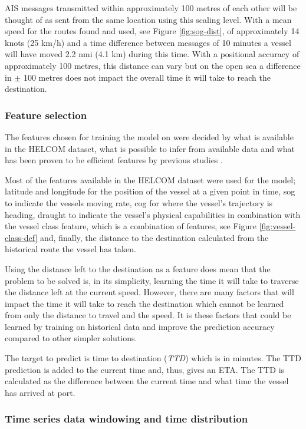 \documentclass[../main.tex]{subfiles}
\begin{document}
AIS messages transmitted within approximately 100 metres of each other will be thought of as sent from the same location using this scaling level. With a mean speed for the routes found and used, see Figure \ref{fig:sog-dist}, of approximately 14 knots (25 km/h) and a time difference between messages of 10 minutes a vessel will have moved 2.2 nmi (4.1 km) during this time. With a positional accuracy of approximately 100 metres, this distance can vary but on the open sea a difference in $\pm$ 100 metres does not impact the overall time it will take to reach the destination.


\subsubsection{Feature selection}

The features chosen for training the model on were decided by what is available in the HELCOM dataset, what is possible to infer from available data and what has been proven to be efficient features by previous studies \cite{El_2020, Jahn_2018}.

Most of the features available in the HELCOM dataset were used for the model; latitude and longitude for the position of the vessel at a given point in time, sog to indicate the vessels moving rate, cog for where the vessel's trajectory is heading, draught to indicate the vessel's physical capabilities in combination with the vessel class feature, which is a combination of features, see Figure \ref{fig:vessel-class-def} and, finally, the distance to the destination calculated from the historical route the vessel has taken.

Using the distance left to the destination as a feature does mean that the problem to be solved is, in its simplicity, learning the time it will take to traverse the distance left at the current speed. However, there are many factors that will impact the time it will take to reach the destination which cannot be learned from only the distance to travel and the speed. It is these factors that could be learned by training on historical data and improve the prediction accuracy compared to other simpler solutions.

The target to predict is time to destination (\textit{TTD}) which is in minutes. The TTD prediction is added to the current time and, thus, gives an ETA. The TTD is calculated as the difference between the current time and what time the vessel has arrived at port.

\subsubsection{Time series data windowing and time distribution}
\label{sec:timeseries}
\end{document}

